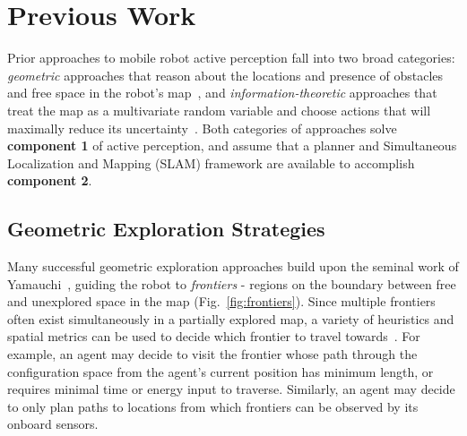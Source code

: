 


\section{Previous Work}

Prior approaches to mobile robot active perception fall into two
broad categories: \textit{geometric} approaches that reason about the locations and
presence of obstacles and free space in the robot's
map~\cite{acar2002sensor,chan1993line,wang2007view,
burgard2000collaborative,taylor1993exploration,yamauchi1997frontier}, and
\textit{information-theoretic} approaches that treat the map as
a multivariate random variable and choose actions that will maximally reduce its
uncertainty~\cite{amigoni2010information,bourgault2002information,charrow2015icra,
julian2013mutual,feder1999adaptive}. Both categories of approaches solve {\bf
component 1} of active perception, and assume that a planner and Simultaneous
Localization and Mapping (SLAM) framework are available to accomplish {\bf
component 2}.

\subsection{Geometric Exploration Strategies}

Many successful geometric exploration approaches build upon the seminal work of
Yamauchi~\cite{yamauchi1997frontier}, guiding the robot to \textit{frontiers} - regions on the boundary
between free and unexplored space in the map (Fig.~\ref{fig:frontiers}).
Since multiple frontiers often exist simultaneously in a partially explored map, a
variety of heuristics and spatial metrics can be used to decide which frontier to
travel towards~\cite{lavalle2006planning}. For example, an agent may decide to
visit the frontier whose path through the configuration space from the agent's current
position has minimum length, or requires minimal time or energy input to
traverse. Similarly, an agent may decide to only plan paths to locations
from which frontiers can be observed by its onboard sensors.

